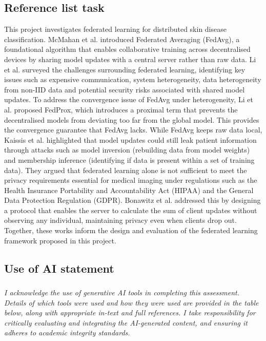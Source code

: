 \documentclass[12pt]{article}
\begin{document}
\subsection*{Reference list task}
This project investigates federated learning for distributed skin disease classification. McMahan et al. \cite{mcmahanCommunicationEfficientLearningDeep2023} introduced Federated Averaging (FedAvg), a foundational algorithm that enables collaborative training across decentralised devices by sharing model updates with a central server rather than raw data. Li et al. \cite{liFederatedLearningChallenges2020} surveyed the challenges surrounding federated learning, identifying key issues such as expensive communication, system heterogeneity, data heterogeneity from non-IID data and potential security risks associated with shared model updates. To address the convergence issue of FedAvg under heterogeneity, Li et al. \cite{liFederatedOptimizationHeterogeneous2020} proposed FedProx, which introduces a proximal term that prevents the decentralised models from deviating too far from the global model. This provides the convergence guarantee that FedAvg lacks. While FedAvg keeps raw data local, Kaissis et al. \cite{kaissisSecurePrivacypreservingFederated2020} highlighted that model updates could still leak patient information through attacks such as model inversion (rebuilding data from model weights) and membership inference (identifying if data is present within a set of training data). They argued that federated learning alone is not sufficient to meet the privacy requirements essential for medical imaging under regulations such as the Health Insurance Portability and Accountability Act (HIPAA) and the General Data Protection Regulation (GDPR). Bonawitz et al. \cite{bonawitzPracticalSecureAggregation2017} addressed this by designing a protocol that enables the server to calculate the sum of client updates without observing any individual, maintaining privacy even when clients drop out. Together, these works inform the design and evaluation of the federated learning framework proposed in this project.




\subsection*{Use of AI statement}
\subsubsection*{}
\noindent \textit{I acknowledge the use of generative AI tools in completing this assessment. Details of which tools were used and how they were used are provided in the table below, along with appropriate in-text and full references. I take responsibility for critically evaluating and integrating the AI-generated content, and ensuring it adheres to academic integrity standards.}
\end{document}
